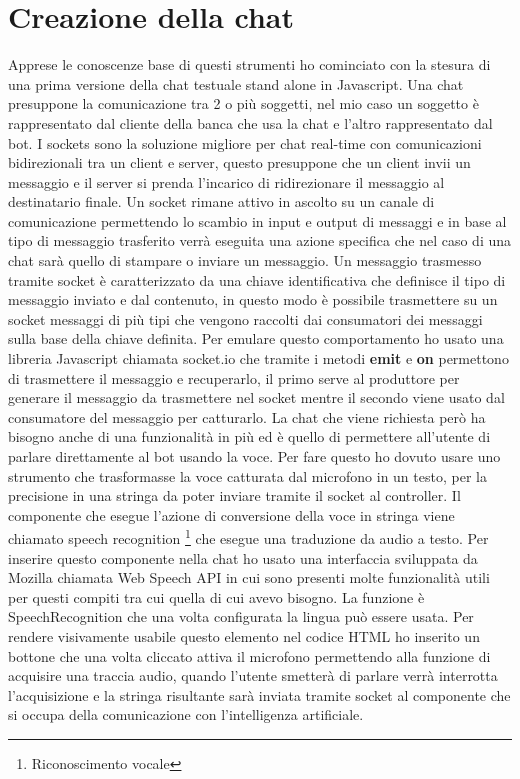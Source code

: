 \section{Creazione della chat}
Apprese le conoscenze base di questi strumenti ho cominciato con la stesura di una prima versione della chat testuale stand alone in Javascript. 
Una chat presuppone la comunicazione tra 2 o più soggetti, nel mio caso un soggetto è rappresentato dal cliente della banca che usa la chat e l'altro rappresentato dal bot.
I sockets sono la soluzione migliore per chat real-time con comunicazioni bidirezionali tra un client e server, questo presuppone che un client invii un messaggio e il server si prenda l'incarico di ridirezionare il messaggio al destinatario finale.
Un socket rimane attivo in ascolto su un canale di comunicazione permettendo lo scambio in input e output di messaggi e in base al tipo di messaggio trasferito verrà eseguita una azione specifica che nel caso di una chat sarà quello di stampare o inviare un messaggio. 
Un messaggio trasmesso tramite socket è caratterizzato da una chiave identificativa che definisce il tipo di messaggio inviato e dal contenuto, in questo modo è possibile trasmettere su un socket messaggi di più tipi che vengono raccolti dai consumatori dei messaggi sulla base della chiave definita. 
Per emulare questo comportamento ho usato una libreria Javascript chiamata socket.io  che tramite i metodi \textbf{emit} e \textbf{on} permettono di trasmettere il messaggio e recuperarlo, il primo serve al produttore per generare il messaggio da trasmettere nel socket mentre il secondo viene usato dal consumatore del messaggio per catturarlo.
La chat che viene richiesta però ha bisogno anche di una funzionalità in più ed è quello di permettere all'utente di parlare direttamente al bot usando la voce. Per fare questo ho dovuto usare uno strumento che trasformasse la voce catturata dal microfono in un testo, per la precisione in una stringa da poter inviare tramite il socket al controller. 
Il componente che esegue l'azione di conversione della voce in stringa viene chiamato speech recognition \footnote{Riconoscimento vocale} che esegue una traduzione da audio a testo. Per inserire questo componente nella chat ho usato una interfaccia sviluppata da Mozilla chiamata Web Speech API in cui sono presenti molte funzionalità utili per questi compiti tra cui quella di cui avevo bisogno. La funzione è SpeechRecognition che una volta configurata la lingua può essere usata. 
Per rendere visivamente usabile questo elemento nel codice HTML ho inserito un bottone che una volta cliccato attiva il microfono permettendo alla funzione di acquisire una traccia audio, quando l'utente smetterà di parlare verrà interrotta l'acquisizione e la stringa risultante sarà inviata tramite socket al componente che si occupa della comunicazione con l'intelligenza artificiale.
